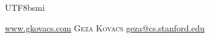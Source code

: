 \documentclass[10pt,letterpaper]{article}
\newcommand{\metasection}[2]
{
\footnotesize{#2} \hspace*{\fill} \footnotesize{#1}\\[1pt]
}
\begin{document}
\begin{CJK}{UTF8}{bsmi}








\vspace{-8pt}
\begin{center}
  \small \hypersetup{urlcolor=black}\href{https://www.gkovacs.com}{www.gkovacs.com}\hypersetup{urlcolor=linkcol} \hfill \hspace{5mm} \LARGE \textsc{Geza Kovacs} \small \hfill \hypersetup{urlcolor=black}\href{mailto:geza@cs.stanford.edu}{geza@cs.stanford.edu}\hypersetup{urlcolor=linkcol}
\end{center}


\thispagestyle{firststyle}






\end{CJK}
\end{document}
